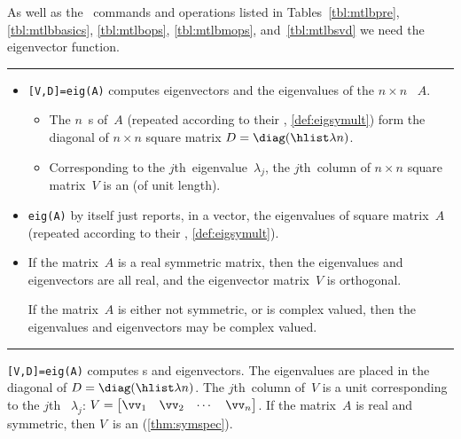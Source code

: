 \begin{table}
\caption{As well as the \script\ commands and operations listed in Tables~\ref{tbl:mtlbpre}, \ref{tbl:mtlbbasics}, \ref{tbl:mtlbops}, \ref{tbl:mtlbmops}, and~\ref{tbl:mtlbsvd}  we need the eigenvector function.} \label{tbl:mtlbeig}
\hrule
\begin{minipage}{\linewidth}
\begin{itemize}
\item {}\verb|[V,D]=eig(A)| computes eigenvectors and the eigenvalues of the  \(n\times n\) ~\(A\).
\begin{itemize}
\item The \(n\)~s of~\(A\) (repeated according to their , \autoref{def:eigsymult}) form the diagonal of \(n\times n\) square matrix \(D=\diag(\hlist\lambda n)\).
\item Corresponding to the \(j\)th~eigenvalue~\(\lambda_j\), the \(j\)th~column of \(n\times n\) square matrix~\(V\) is an  (of unit length).
\end{itemize}
\item \verb|eig(A)| by itself just reports, in a vector, the eigenvalues of square matrix~\(A\) (repeated according to their  , \autoref{def:eigsymult}).

\item If the matrix~\(A\) is a real symmetric matrix, then the eigenvalues and eigenvectors are all real, and the eigenvector matrix~\(V\) is orthogonal.

If the matrix~\(A\) is either not symmetric, or is complex valued, then the eigenvalues and eigenvectors may be complex valued.

\end{itemize}
\end{minipage}
\hrule
\end{table}

\begin{compute}
\verb|[V,D]=eig(A)| computes s and eigenvectors.
The eigenvalues are placed in the diagonal of \(D=\diag(\hlist\lambda n)\). 
The \(j\)th~column of~\(V\) is a unit  corresponding to the \(j\)th ~\(\lambda_j\):
\(V=\begin{bmatrix} \vv_1&\vv_2&\cdots&\vv_n \end{bmatrix}\).
If the matrix~\(A\) is real and symmetric, then \(V\)~is an  (\autoref{thm:symspec}).
\end{compute}

